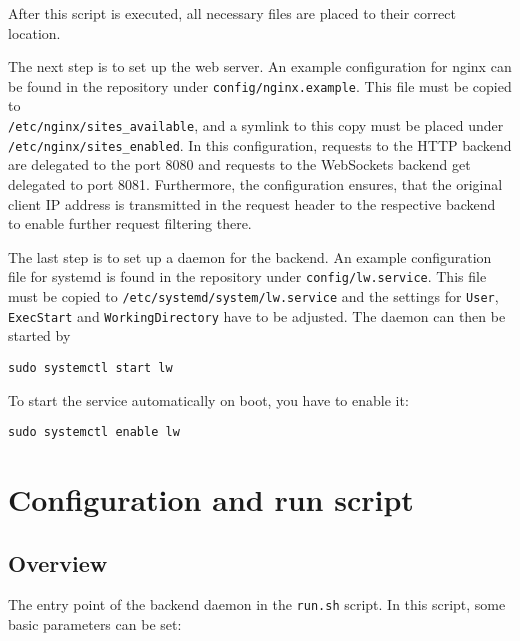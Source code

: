 After this script is executed, all necessary files are placed to their correct location.

The next step is to set up the web server. An example configuration for nginx can be found
in the repository under \verb|config/nginx.example|. This file must be copied to\\ \verb|/etc/nginx/sites_available|,
and a symlink to this copy must be placed under\\ \verb|/etc/nginx/sites_enabled|. In this configuration, requests to
the HTTP backend are delegated to the port 8080 and requests to the WebSockets backend get delegated to port 8081.
Furthermore, the configuration ensures, that the original client IP address is transmitted in the request header to
the respective backend to enable further request filtering there.

The last step is to set up a daemon for the backend. An example configuration file for systemd is found in the
repository under \verb|config/lw.service|. This file must be copied to \verb|/etc/systemd/system/lw.service|
and the settings for \verb|User|, \verb|ExecStart| and \verb|WorkingDirectory| have to be adjusted.
The daemon can then be started by
\begin{verbatim}
sudo systemctl start lw
\end{verbatim}
To start the service automatically on boot, you have to enable it:
\begin{verbatim}
sudo systemctl enable lw
\end{verbatim}

\section{Configuration and run script}
\subsection{Overview}
\label{section:config}
The entry point of the backend daemon in the \verb|run.sh| script. In this script, some basic
parameters can be set:

